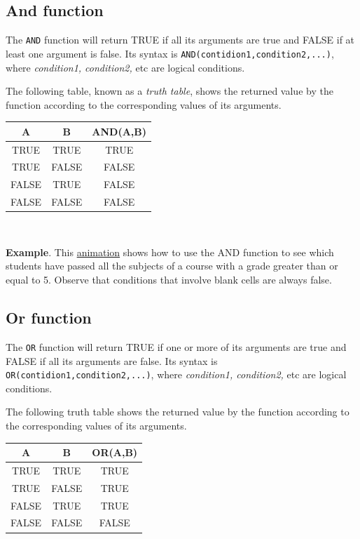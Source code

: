 \subsection{And function}\hypertarget{and-function}{}\label{and-function}

The \texttt{AND} function will return TRUE if all its arguments are true and FALSE if at least one argument is false. Its syntax is \texttt{AND(contidion1,condition2,...)}, where \emph{condition1, condition2,} etc are logical conditions.

The following table, known as a \emph{truth table}, shows the returned value by the function according to the corresponding values of its arguments.

\begin{longtable}{|c|c|c|}
\hline
A & B & AND(A,B)\\
\hline
TRUE & TRUE & TRUE\\
TRUE & FALSE & FALSE\\
FALSE & TRUE & FALSE\\
FALSE & FALSE & FALSE\\
\hline
\end{longtable}

~{}

\textbf{Example}. This \href{http://aprendeconalf.es/office/excel/manual/img/example_function_and.gif}{animation} shows how to use the AND function to see which students have passed all the subjects of a course with a grade greater than or equal to 5. Observe that conditions that involve blank cells are always false.

\subsection{Or function}\hypertarget{or-function}{}\label{or-function}

The \texttt{OR} function will return TRUE if one or more of its arguments are true and FALSE if all its arguments are false. Its syntax is \texttt{OR(contidion1,condition2,...)}, where \emph{condition1, condition2,} etc are logical conditions.

The following truth table shows the returned value by the function according to the corresponding values of its arguments.

\begin{longtable}{|c|c|c|}
\hline
A & B & OR(A,B)\\
\hline
TRUE & TRUE & TRUE\\
TRUE & FALSE & TRUE\\
FALSE & TRUE & TRUE\\
FALSE & FALSE & FALSE\\
\hline
\end{longtable}

